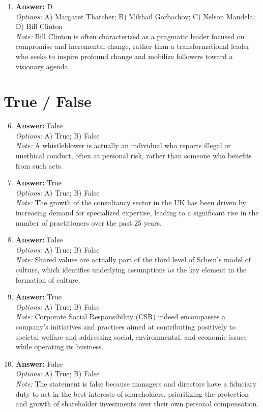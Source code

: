 \documentclass[12pt]{article}
\begin{document}
\begin{enumerate}[label=\arabic*.]
\\ \textit{Note:} The correct answer is "Strengths, weaknesses, opportunities, threats" because SWOT analysis is a strategic planning tool used to identify and evaluate the internal and external factors that can impact an organization's success.
\item \textbf{Answer:} D
\\ \textit{Options:} A) Margaret Thatcher; B) Mikhail Gorbachov; C) Nelson Mandela; D) Bill Clinton
\\ \textit{Note:} Bill Clinton is often characterized as a pragmatic leader focused on compromise and incremental change, rather than a transformational leader who seeks to inspire profound change and mobilize followers toward a visionary agenda.
\end{enumerate}

\section*{True / False}
\begin{enumerate}[label=\arabic*.]
\setcounter{enumi}{5}
\item \textbf{Answer:} False
\\ \textit{Options:} A) True; B) False
\\ \textit{Note:} A whistleblower is actually an individual who reports illegal or unethical conduct, often at personal risk, rather than someone who benefits from such acts.
\item \textbf{Answer:} True
\\ \textit{Options:} A) True; B) False
\\ \textit{Note:} The growth of the consultancy sector in the UK has been driven by increasing demand for specialized expertise, leading to a significant rise in the number of practitioners over the past 25 years.
\item \textbf{Answer:} False
\\ \textit{Options:} A) True; B) False
\\ \textit{Note:} Shared values are actually part of the third level of Schein's model of culture, which identifies underlying assumptions as the key element in the formation of culture.
\item \textbf{Answer:} True
\\ \textit{Options:} A) True; B) False
\\ \textit{Note:} Corporate Social Responsibility (CSR) indeed encompasses a company's initiatives and practices aimed at contributing positively to societal welfare and addressing social, environmental, and economic issues while operating its business.
\item \textbf{Answer:} False
\\ \textit{Options:} A) True; B) False
\\ \textit{Note:} The statement is false because managers and directors have a fiduciary duty to act in the best interests of shareholders, prioritizing the protection and growth of shareholder investments over their own personal compensation.
\end{enumerate}
\end{document}

